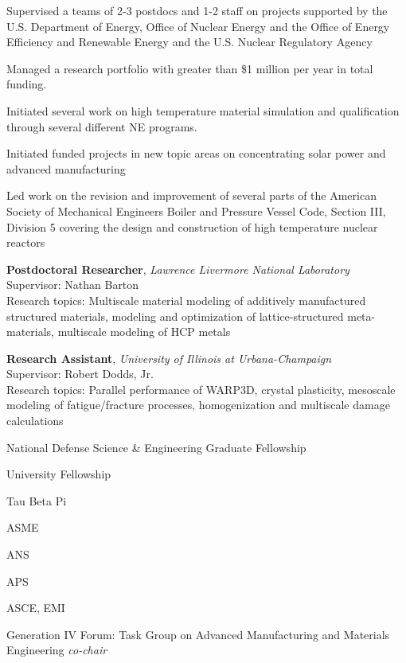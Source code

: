 Supervised a teams of 2-3 postdocs and 1-2 staff on projects
supported by the U.S. Department of Energy, Office of Nuclear Energy and 
the Office of Energy Efficiency and Renewable Energy
and the U.S. Nuclear Regulatory Agency

Managed a research portfolio with greater than \$1 million per year in total funding.  

Initiated several work on high temperature material simulation and qualification through several different NE programs.

Initiated funded projects in new topic areas on concentrating solar power and advanced manufacturing

Led work on the revision and improvement of several parts of the American Society of 
Mechanical Engineers Boiler and Pressure Vessel Code, Section III, Division 5 covering the
design and construction of high temperature nuclear reactors

\textbf{Postdoctoral Researcher}, \emph{Lawrence Livermore National
Laboratory} \\
Supervisor: Nathan Barton \\
Research topics: Multiscale material modeling of additively manufactured
structured materials, modeling and optimization of lattice-structured
meta-materials, multiscale modeling of HCP metals

\textbf{Research Assistant}, \emph{University of Illinois at Urbana-Champaign}
\\
Supervisor: Robert Dodds, Jr. \\
Research topics: Parallel performance of WARP3D, crystal plasticity,
mesoscale modeling of fatigue/fracture processes, homogenization and
multiscale damage calculations


National Defense Science \& Engineering Graduate Fellowship 

University Fellowship 

Tau Beta Pi 


ASME 

ANS 

APS 

ASCE, EMI 


Generation IV Forum:  Task Group on Advanced Manufacturing and Materials Engineering \emph{co-chair} 

